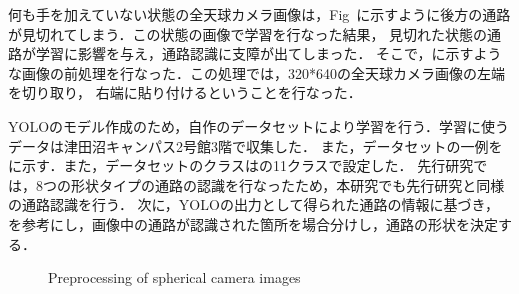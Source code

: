 \documentclass[../main]{subfiles}
\begin{document}
        \newpage
        
        何も手を加えていない状態の全天球カメラ画像は，Fig~に示すように後方の通路が見切れてしまう．この状態の画像で学習を行なった結果，
        見切れた状態の通路が学習に影響を与え，通路認識に支障が出てしまった．
        そこで，に示すような画像の前処理を行なった．この処理では，320*640の全天球カメラ画像の左端を切り取り，
        右端に貼り付けるということを行なった．

        YOLOのモデル作成のため，自作のデータセットにより学習を行う．学習に使うデータは津田沼キャンパス2号館3階で収集した．
        また，データセットの一例をに示す．また，データセットのクラスはの11クラスで設定した．
        先行研究では，8つの形状タイプの通路の認識を行なったため，本研究でも先行研究と同様の通路認識を行う．
        次に，YOLOの出力として得られた通路の情報に基づき，を参考にし，画像中の通路が認識された箇所を場合分けし，通路の形状を決定する．

        \begin{figure}[htbp]
          \centering
           \caption{Preprocessing of spherical camera images}
           \label{figure::proc_exp}
        \end{figure}
\end{document}
